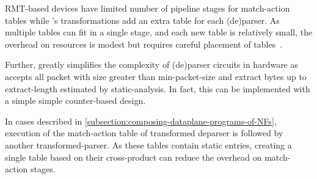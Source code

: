 \documentclass[letterpaper,twocolumn,10pt]{article}
\begin{document}


%
RMT-based devices have limited number of pipeline stages for
match-action tables while \ucomp's transformations add an extra table
for each (de)parser. As multiple tables can fit in a single stage, and
each new table is relatively small, the overhead on resources is
modest but requires careful placement of
tables~\cite{jose2015compiling}.

Further, \ucomp greatly simplifies the complexity of (de)parser
circuits in hardware as \ucomp accepts all packet with size greater
than min-packet-size and extract bytes up to extract-length estimated
by static-analysis. In fact, this can be implemented with a simple
simple counter-based design.


 In cases described in
\cref{subsection:composing-dataplane-programs-of-NFs}, execution of
the match-action table of transformed deparser is followed by another
transformed-parser. As these tables contain static entries, creating a
single table based on their cross-product can reduce the overhead on
match-action stages.




\end{document}

